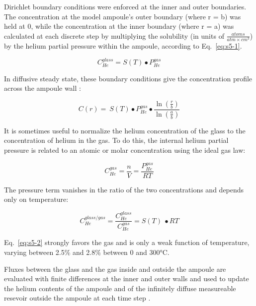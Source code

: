 Dirichlet boundary conditions were enforced at the inner and outer
boundaries. The concentration at the model ampoule's outer boundary
(where r = b) was held at 0, while the concentration at the inner
boundary (where r = a) was calculated at each discrete step by
multiplying the solubility (in units of
\(\frac{atoms}{atm \times cm^{3}}\)) by the helium partial pressure
within the ampoule, according to Eq.~\eqref{eq:s5-1}.

\begin{equation}
C_{He}^{glass} = S(T) \bullet P_{He}^{gas}
\label{eq:s5-1}
\end{equation}

In diffusive steady state, these boundary conditions give the concentration profile across the ampoule wall \citep{thyer2026thesis}:

\begin{equation}
C(r) = \ S(T) \bullet P_{He}^{gas} \bullet \frac{\ln\left( \frac{r}{b} \right)}{\ln\left( \frac{a}{b} \right)}
\label{eq:s4-3}
\end{equation}

It is sometimes useful to normalize the helium concentration of the
glass to the concentration of helium in the gas. To do this, the
internal helium partial pressure is related to an atomic or molar
concentration using the ideal gas law:

\[
C_{He}^{gas} = \frac{n}{V} = \frac{P_{He}^{gas}}{RT}
\]

The pressure term vanishes in the ratio of the two concentrations and
depends only on temperature:

\begin{equation}
C_{He}^{glass/gas} = \frac{C_{He}^{glass}}{C_{He}^{gas}} = S(T)\  \bullet RT
\label{eq:s5-2}
\end{equation}

Eq.~\eqref{eq:s5-2} strongly favors the gas and is only a weak function of temperature, varying between 2.5\% and 2.8\% between 0 and 300°C.

Fluxes between the glass and the gas inside and outside the ampoule are evaluated with finite differences at the inner and 
outer walls and used to update the helium contents of the ampoule and of the infinitely diffuse measureable resevoir 
outside the ampoule at each time step \citep{thyer2026thesis}.

